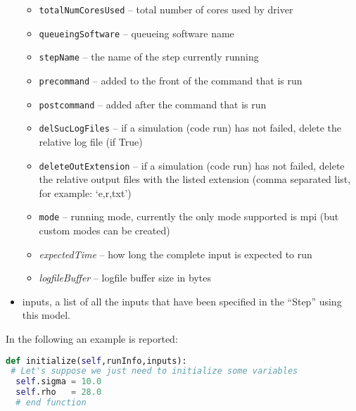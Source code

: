 \begin{itemize}
\begin{itemize}
    \item \texttt{totalNumCoresUsed} -- total number of cores used by driver
    \item \texttt{queueingSoftware} -- queueing software name
    \item \texttt{stepName} -- the name of the step currently running
    \item \texttt{precommand} -- added to the front of the command that is run
    \item \texttt{postcommand} -- added after the command that is run
    \item \texttt{delSucLogFiles} -- if a simulation (code run) has not failed,
    delete the relative log file (if True)
    \item \texttt{deleteOutExtension} -- if a simulation (code run) has not
    failed, delete the relative output files with the listed extension (comma
    separated list, for example: `e,r,txt')
    \item \texttt{mode} -- running mode, currently the only mode supported is
      mpi (but custom modes can be created)
    \item \textit{expectedTime} -- how long the complete input is expected to
    run
    \item \textit{logfileBuffer} -- logfile buffer size in bytes
  \end{itemize}
  \item inputs, a list of all the inputs that have been specified in the
  ``Step'' using this model.
\end{itemize}
In the following an example is reported:
\begin{lstlisting}[language=python]
def initialize(self,runInfo,inputs):
 # Let's suppose we just need to initialize some variables
  self.sigma = 10.0
  self.rho   = 28.0
  # end function
\end{lstlisting}


